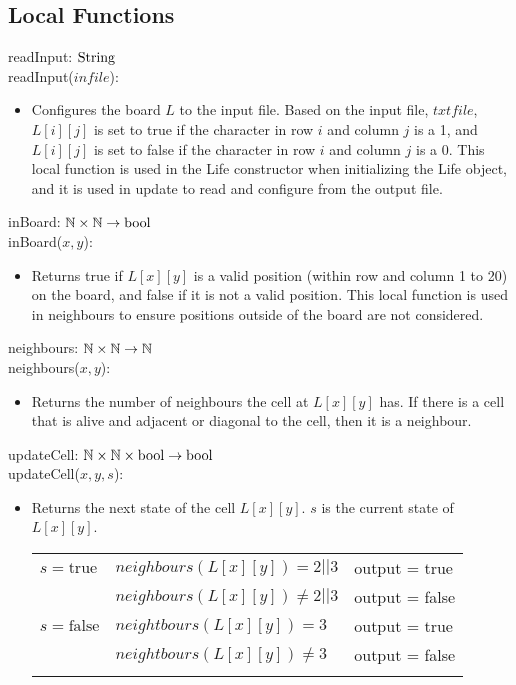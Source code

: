 \documentclass[12pt]{article}
\begin{document}
\subsection*{Local Functions}

\noindent readInput: $\rm String$\\
\noindent readInput($infile$):
\begin{itemize}
	\item Configures the board $L$ to the input file. Based on the input file, $txtfile$, $L[i][j]$ is set to true if the character in row $i$ and column $j$ is a 1, and $L[i][j]$ is set to false if the character in row $i$ and column $j$ is a 0. This local function is used in the Life constructor when initializing the Life object, and it is used in update to read and configure from the output file.
\end{itemize}

\noindent inBoard: $\rm \mathbb{N} \times \mathbb{N} \rightarrow bool$\\
\noindent inBoard($x, y$):
\begin{itemize}
	\item Returns true if $L[x][y]$ is a valid position (within row and column 1 to 20) on the board, and false if it is not a valid position. This local function is used in neighbours to ensure positions outside of the board are not considered.
\end{itemize}

\noindent neighbours: $\rm \mathbb{N} \times \mathbb{N} \rightarrow \mathbb{N}$\\
\noindent neighbours($x, y$):
\begin{itemize}
	\item Returns the number of neighbours the cell at $L[x][y]$ has. If there is a cell that is alive and adjacent or diagonal to the cell, then it is a neighbour. 
\end{itemize}


\noindent updateCell: $\rm \mathbb{N} \times \mathbb{N} \times bool \rightarrow bool$\\
\noindent updateCell($x, y, s$):
\begin{itemize}
	\item Returns the next state of the cell $L[x][y]$. $s$ is the current state of $L[x][y]$.

\begin{tabular}{|p{2.5cm}|p{5cm}|l|}
\hhline{|-|-|-|}
$s = \mbox{true}$ & $neighbours(L[x][y]) = 2 || 3$ & output = true \\
\hhline{|~|-|-|}
& $neighbours(L[x][y]) \neq 2 || 3 $ & output = false  \\
\hhline{|~|-|-|}
$s = \mbox{false}$ & $neightbours(L[x][y]) = 3$ & output = true \\
\hhline{|~|-|-|}
& $neightbours(L[x][y]) \neq 3$ & output = false  \\
\hhline{|~|-|-|}
\end{tabular}
\end{itemize}
\end{document}
